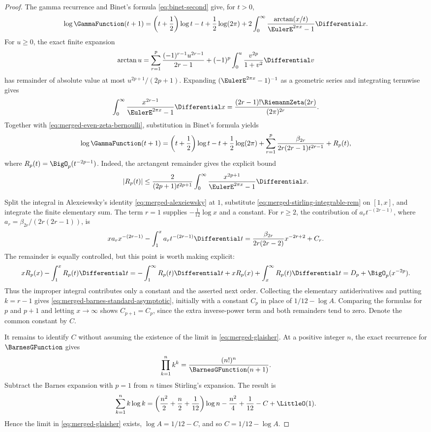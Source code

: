 \documentclass[11pt,a4paper,oneside,openany]{book}
\theoremstyle{definition}
\theoremstyle{remark}
\begin{document}
\begin{proof}
The gamma recurrence and Binet's formula \eqref{eq:binet-second} give, for
$t>0$,
\[
 \log\GammaFunction(t+1)
 =\left(t+\frac12\right)\log t-t+\frac12\log(2\pi)
 +2\int_0^\infty\frac{\arctan(x/t)}{\EulerE^{2\pi x}-1}\Differential x.
\]
For $u\geq0$, the exact finite expansion
\[
 \arctan u
 =\sum_{r=1}^{p}\frac{(-1)^{r-1}u^{2r-1}}{2r-1}
 +(-1)^p\int_0^u\frac{v^{2p}}{1+v^2}\Differential v
\]
has remainder of absolute value at most $u^{2p+1}/(2p+1)$.  Expanding
$(\EulerE^{2\pi x}-1)^{-1}$ as a geometric series and integrating termwise
gives
\[
 \int_0^\infty\frac{x^{2r-1}}{\EulerE^{2\pi x}-1}\Differential x
 =\frac{(2r-1)!\RiemannZeta(2r)}{(2\pi)^{2r}}.
\]
Together with \eqref{eq:merged-even-zeta-bernoulli}, substitution in Binet's
formula yields
\begin{equation}
 \log\GammaFunction(t+1)
 =\left(t+\frac12\right)\log t-t+\frac12\log(2\pi)
 +\sum_{r=1}^{p}\frac{\beta_{2r}}
 {2r(2r-1)t^{2r-1}}+R_p(t),
                                                                  \label{eq:merged-stirling-integrable-rem}
\end{equation}
where $R_p(t)=\BigO_p(t^{-2p-1})$.
Indeed, the arctangent remainder gives the explicit bound
\[
 |R_p(t)|\leq\frac{2}{(2p+1)t^{2p+1}}
 \int_0^\infty\frac{x^{2p+1}}{\EulerE^{2\pi x}-1}\Differential x.
\]

Split the integral in Alexeiewsky's identity
\eqref{eq:merged-alexeiewsky} at $1$, substitute
\eqref{eq:merged-stirling-integrable-rem} on $[1,x]$, and integrate the
finite elementary sum.  The term $r=1$ supplies
$-\frac1{12}\log x$ and a constant.  For $r\geq2$, the contribution of
$a_rt^{-(2r-1)}$, where
$a_r=\beta_{2r}/(2r(2r-1))$, is
\[
 xa_rx^{-(2r-1)}-\int_1^x a_rt^{-(2r-1)}\Differential t
 =\frac{\beta_{2r}}{2r(2r-2)}x^{-2r+2}+C_r.
\]
The remainder is equally controlled, but this point is worth making
explicit:
\[
 xR_p(x)-\int_1^xR_p(t)\Differential t
 =-\int_1^\infty R_p(t)\Differential t
   +xR_p(x)+\int_x^\infty R_p(t)\Differential t
 =D_p+\BigO_p(x^{-2p}).
\]
Thus the improper integral contributes only a constant and the asserted next
order.  Collecting the elementary antiderivatives and putting $k=r-1$ gives
\eqref{eq:merged-barnes-standard-asymptotic}, initially with a constant
$C_p$ in place of $1/12-\log A$.  Comparing the formulas for $p$ and $p+1$
and letting $x\to\infty$ shows $C_{p+1}=C_p$, since the extra inverse-power
term and both remainders tend to zero.  Denote the common constant by $C$.

It remains to identify $C$ without assuming the existence of the limit in
\eqref{eq:merged-glaisher}.  At a positive integer $n$, the exact recurrence
for $\BarnesGFunction$ gives
\[
 \prod_{k=1}^n k^k=\frac{(n!)^n}{\BarnesGFunction(n+1)}.
\]
Subtract the Barnes expansion with $p=1$ from $n$ times Stirling's expansion.
The result is
\[
 \sum_{k=1}^n k\log k
 =\left(\frac{n^2}{2}+\frac n2+\frac1{12}\right)\log n
  -\frac{n^2}{4}+\frac1{12}-C+\LittleO(1).
\]
Hence the limit in \eqref{eq:merged-glaisher} exists,
$\log A=1/12-C$, and so $C=1/12-\log A$.


\end{proof}
\end{document}
